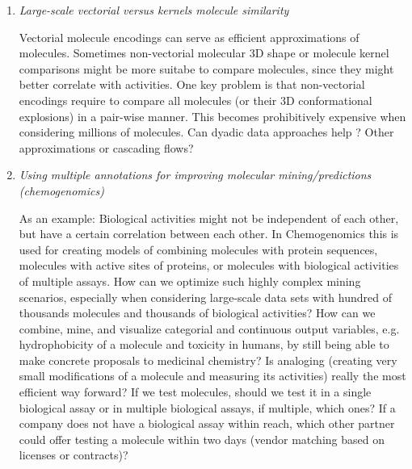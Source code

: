 \documentclass{sig-alternate}
\begin{document}
\begin{enumerate}
\item \emph{Large-scale vectorial versus kernels molecule similarity}

  Vectorial molecule encodings can serve as efficient approximations
  of molecules.  Sometimes non-vectorial molecular 3D shape or
  molecule kernel comparisons might be more suitabe to compare
  molecules, since they might better correlate with activities. One
  key problem is that non-vectorial encodings require to compare all
  molecules (or their 3D conformational explosions) in a pair-wise
  manner.  This becomes prohibitively expensive when considering
  millions of molecules.  Can dyadic data approaches help
  \cite{Hochreiter:2006:SVM:1159508.1159516}? Other approximations or
  cascading flows?
%
\item \emph{Using multiple annotations for improving molecular mining/predictions (chemogenomics)}

  As an example: Biological activities might not be independent of
  each other, but have a certain correlation between each other.  In
  Chemogenomics this is used for creating models of combining
  molecules with protein sequences, molecules with active sites of
  proteins, or molecules with biological activities of multiple
  assays. How can we optimize such highly complex mining scenarios,
  especially when considering large-scale data sets with hundred of
  thousands molecules and thousands of biological activities?  How can
  we combine, mine, and visualize categorial and continuous output
  variables, e.g. hydrophobicity of a molecule and toxicity in humans,
  by still being able to make concrete proposals to medicinal
  chemistry? Is analoging (creating very small modifications of a
  molecule and measuring its activities) really the most efficient way
  forward? If we test molecules, should we test it in a single
  biological assay or in multiple biological assays, if multiple,
  which ones?  If a company does not have a biological assay within
  reach, which other partner could offer testing a molecule within two
  days (vendor matching based on licenses or contracts)?
\end{enumerate} 
\end{document}
